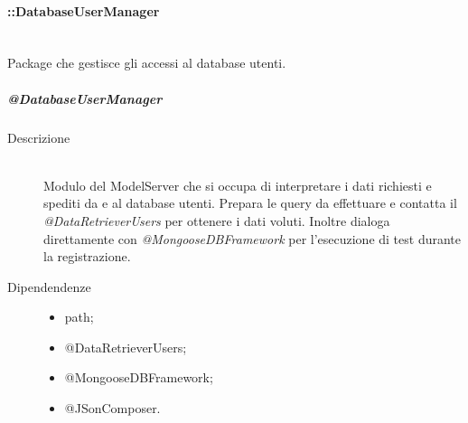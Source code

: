 \paragraph{::DatabaseUserManager} \\
Package che gestisce gli accessi al database utenti.

\subparagraph{@DatabaseUserManager}
\begin{description}
 \item[Descrizione] \hfill \\
Modulo del ModelServer che si occupa di interpretare i dati richiesti e spediti da e al database utenti. 
Prepara le query da effettuare e contatta il \textit{@DataRetrieverUsers} per ottenere i dati voluti. 
Inoltre dialoga direttamente con \textit{@MongooseDBFramework} per l'esecuzione di test durante la registrazione. 
 \item[Dipendendenze] \hfill
 \begin{itemize}
  \item path;
  \item @DataRetrieverUsers;
  \item @MongooseDBFramework;
  \item @JSonComposer.
 \end{itemize}
  

\end{description}
